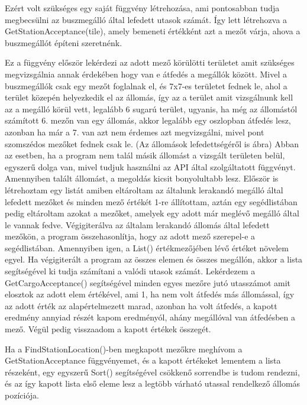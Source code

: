 Ezért volt szükséges egy saját függvény létrehozása, ami pontosabban tudja megbecsülni az buszmegálló által lefedett utasok számát. Így lett létrehozva a GetStationAcceptance(tile), amely bemeneti értékként azt a mezőt várja, ahova a buszmegállót építeni szeretnénk.

Ez a függvény először lekérdezi az adott mező körülötti területet amit szükséges megvizsgálnia annak érdekében hogy van e átfedés a megállók között. Mivel a buszmegállók csak egy mezőt foglalnak el, és 7x7-es területet fednek le, ahol a terület közepén helyezkedik el az állomás, így az a terület amit vizsgálnunk kell az a megálló körül vett, legalább 6 sugarú terület, ugyanis, ha még az állomástól számított 6. mezőn van egy állomás, akkor legalább egy oszlopban átfedés lesz, azonban ha már a 7. van azt nem érdemes azt megvizsgálni, mivel pont szomszédos mezőket fednek csak le. (Az állomások lefedettségéről is ábra) Abban az esetben, ha a program nem talál másik állomást a vizsgált területen belül, egyszerű dolga van, mivel tudjuk használni az API által szolgáltatott függvényt. Amennyiben talált állomást, a megoldás kicsit bonyolultabb lesz. Először is létrehoztam egy listát amiben eltároltam az általunk lerakandó megálló által lefedett mezőket és minden mező értékét 1-re állítottam, aztán egy segédlistában pedig eltároltam azokat a mezőket, amelyek egy adott már meglévő megálló által le vannak fedve. Végigiterálva az általam lerakandó állomás által lefedett mezőkön, a program összehasonlítja, hogy az adott mező szerepel-e a segédlistában. Amennyiben igen, a List() értékmezőjében lévő értéket növelem egyel. Ha végigiterált a program az összes elemen és összes megállón, akkor a lista segítségével ki tudja számítani a valódi utasok számát. Lekérdezem a GetCargoAcceptance() segítségével minden egyes mezőre jutó utasszámot amit elosztok az adott elem értékével, ami 1, ha nem volt átfedés más állomással, így az adott érték az alapértelmezett marad, azonban ha volt átfedés, a kapott eredmény annyiad részét kapom eredményól, ahány megállóval van átfedésben a mező. Végül pedig visszaadom a kapott értékek összegét.

Ha a FindStationLocation()-ben megkapott mezőkre meghívom a GetStationAcceptance függvényemet, és a kapott értékeket lementem a lista részeként, egy egyszerű Sort() segítségével csökkenő sorrendbe is tudom rendezni, és az így kapott lista első eleme lesz a legtöbb várható utassal rendelkező állomás pozíciója.

